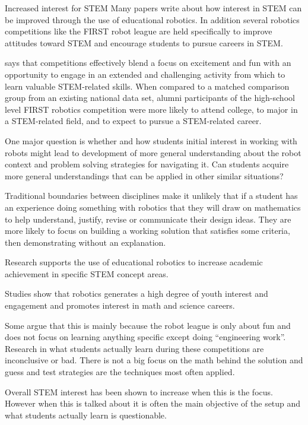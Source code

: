 \bigskip\noindent
Increased interest for STEM
Many papers write about how interest in STEM can be improved through the use of educational robotics. In addition several robotics competitions like the FIRST robot league are held specifically to improve attitudes toward STEM and encourage students to pursue careers in STEM.

\cite{silk2011resources} says that competitions effectively blend a focus on excitement and fun with an opportunity to engage in an extended and challenging activity from which to learn valuable STEM-related skills. When compared to a matched comparison group from an existing national data set, alumni participants of the high-school level FIRST robotics competition were more likely to attend college, to major in a STEM-related field, and to expect to pursue a STEM-related career. 

One major question is whether and how students initial interest in working with robots might lead to development of more general understanding about the robot context and problem solving strategies for navigating it. Can students acquire more general understandings that can be applied in other similar situations?

Traditional boundaries between disciplines make it unlikely that if a student has an experience doing something with robotics that they will draw on mathematics to help understand, justify, revise or communicate their design ideas. They are more likely to focus on building a working solution that satisfies some criteria, then demonstrating without an explanation. 

\cite{nugent2009use} Research supports the use of educational robotics to increase academic achievement in specific STEM concept areas.

\cite{nugent2009use} Studies show that robotics generates a high degree of youth interest and engagement and promotes interest in math and science careers.

Some argue that this is mainly because the robot league is only about fun and does not focus on learning anything specific except doing "`engineering work"'. Research in what students actually learn during these competitions are inconclusive or bad. There is not a big focus on the math behind the solution and guess and test strategies are the techniques most often applied.

Overall STEM interest has been shown to increase when this is the focus. However when this is talked about it is often the main objective of the setup and what students actually learn is questionable.

